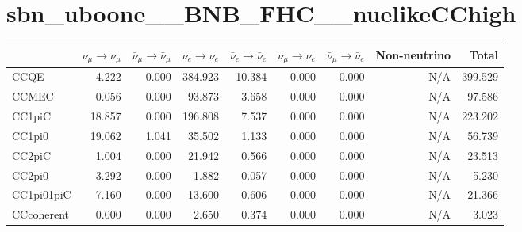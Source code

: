 \newpage
\begin{table}
\section*{sbn\_uboone\_\_BNB\_FHC\_\_nuelikeCChigh}
\begin{adjustbox}{width=1\textwidth}
\begin{tabular} {l r r r r r r r r}
\hline
              & $\nu_{\mu} \rightarrow \nu_{\mu}$ & $\bar{\nu}_{\mu} \rightarrow \bar{\nu}_{\mu}$ & $\nu_{e} \rightarrow \nu_{e}$ & $\bar{\nu}_{e} \rightarrow \bar{\nu}_{e}$ & $\nu_{\mu} \rightarrow \nu_{e}$ & $\bar{\nu}_{\mu} \rightarrow \bar{\nu}_{e}$ & Non-neutrino         & Total                \\ \hline\hline
 CCQE         & 4.222                & 0.000                & 384.923              & 10.384               & 0.000                & 0.000                & N/A                  & 399.529      
        \\ \hline
 CCMEC        & 0.056                & 0.000                & 93.873               & 3.658                & 0.000                & 0.000                & N/A                  & 97.586       
        \\ \hline
 CC1piC       & 18.857               & 0.000                & 196.808              & 7.537                & 0.000                & 0.000                & N/A                  & 223.202      
        \\ \hline
 CC1pi0       & 19.062               & 1.041                & 35.502               & 1.133                & 0.000                & 0.000                & N/A                  & 56.739       
        \\ \hline
 CC2piC       & 1.004                & 0.000                & 21.942               & 0.566                & 0.000                & 0.000                & N/A                  & 23.513       
        \\ \hline
 CC2pi0       & 3.292                & 0.000                & 1.882                & 0.057                & 0.000                & 0.000                & N/A                  & 5.230        
        \\ \hline
 CC1pi01piC   & 7.160                & 0.000                & 13.600               & 0.606                & 0.000                & 0.000                & N/A                  & 21.366       
        \\ \hline
 CCcoherent   & 0.000                & 0.000                & 2.650                & 0.374                & 0.000                & 0.000                & N/A                  & 3.023        

\end{tabular}
\end{adjustbox}
\end{table}
